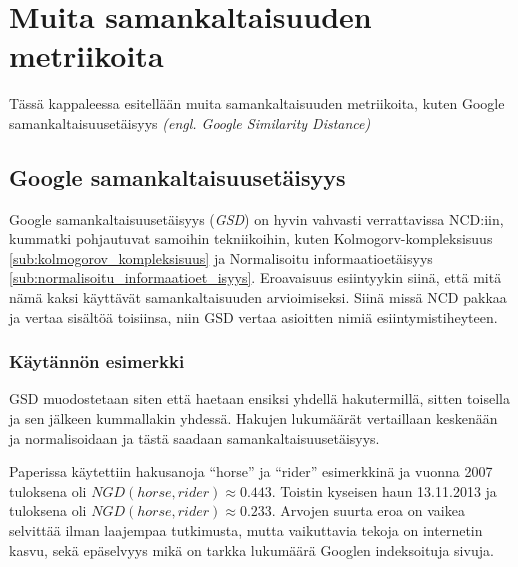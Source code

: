 \documentclass[12pt,finnish,draft]{tktltiki2}
\theoremstyle{definition}
\theoremstyle{remark}
\newcommand{\engl}[1]{\emph{(engl. #1)}}
\begin{document}
\section{Muita samankaltaisuuden metriikoita} %
\label{sec:muita_samankaltaisuuden_metriikoita}
  Tässä kappaleessa esitellään muita samankaltaisuuden metriikoita, kuten Google samankaltaisuusetäisyys \engl{Google Similarity Distance}
  \subsection{Google samankaltaisuusetäisyys} %
  \label{sub:google_similarity_distance}
    Google samankaltaisuusetäisyys (\emph{GSD}) on hyvin vahvasti verrattavissa NCD:iin, kummatki pohjautuvat samoihin tekniikoihin, kuten Kolmogorv-kompleksisuus \ref{sub:kolmogorov_kompleksisuus} ja Normalisoitu informaatioetäisyys \ref{sub:normalisoitu_informaatioet_isyys}. Eroavaisuus esiintyykin siinä, että mitä nämä kaksi käyttävät samankaltaisuuden arvioimiseksi. Siinä missä NCD pakkaa ja vertaa sisältöä toisiinsa, niin GSD vertaa asioitten nimiä esiintymistiheyteen.

    \subsubsection{Käytännön esimerkki} %
    \label{ssub:k_yt_nn_n_esimerkki}
      GSD muodostetaan siten että haetaan ensiksi yhdellä hakutermillä, sitten toisella ja sen jälkeen kummallakin yhdessä. Hakujen lukumäärät vertaillaan keskenään ja normalisoidaan ja tästä saadaan samankaltaisuusetäisyys.

      Paperissa \cite{cilibrasi2007google} käytettiin hakusanoja ``horse'' ja ``rider'' esimerkkinä ja vuonna 2007 tuloksena oli $NGD(horse, rider) \approx 0.443$. Toistin kyseisen haun 13.11.2013 ja tuloksena oli $NGD(horse, rider) \approx 0.233$. Arvojen suurta eroa on vaikea selvittää ilman laajempaa tutkimusta, mutta vaikuttavia tekoja on internetin kasvu, sekä epäselvyys mikä on tarkka lukumäärä Googlen indeksoituja sivuja.


\pagebreak
%
%

%

% 





%
\end{document}
